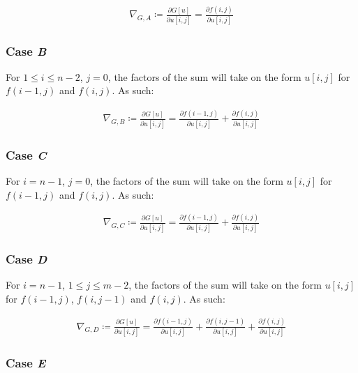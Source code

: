 \documentclass[a4paper]{scrreprt}
\begin{document}
\begin{align*}
		\nabla_{G, A} \coloneqq \frac{\partial G[u]}{\partial u[i, j]} = 
		  \frac{\partial f(i, j)}{\partial u[i, j]}
\end{align*}

\subsubsection{Case \emph{B}}

For $1 \leq i \leq n - 2$, $j = 0$, the factors of the sum will take on the
form $u[i, j]$ for $f(i - 1, j)$ and $f(i, j)$. As such:

\begin{align*}
		\nabla_{G, B} \coloneqq \frac{\partial G[u]}{\partial u[i, j]} = 
		  \frac{\partial f(i - 1, j)}{\partial u[i, j]} 
		  + \frac{\partial f(i, j)}{\partial u[i, j]}
\end{align*}

\subsubsection{Case \emph{C}}

For $i = n - 1$, $j = 0$, the factors of the sum will take on the form $u[i,
j]$ for $f(i - 1, j)$ and $f(i, j)$. As such:

\begin{align*}
		\nabla_{G, C} \coloneqq \frac{\partial G[u]}{\partial u[i, j]} = 
		  \frac{\partial f(i - 1, j)}{\partial u[i, j]} 
		  + \frac{\partial f(i, j)}{\partial u[i, j]}
\end{align*}

\subsubsection{Case \emph{D}}

For $i = n - 1$, $1 \leq j \leq m - 2$, the factors of the sum will take on the
form $u[i, j]$ for $f(i - 1, j)$, $f(i, j - 1)$ and $f(i, j)$. As such:

\begin{align*}
		\nabla_{G, D} \coloneqq \frac{\partial G[u]}{\partial u[i, j]} = 
		  \frac{\partial f(i - 1, j)}{\partial u[i, j]} 
		  + \frac{\partial f(i, j - 1)}{\partial u[i, j]} 
		  + \frac{\partial f(i, j)}{\partial u[i, j]}
\end{align*}

\subsubsection{Case \emph{E}}
\end{document}
